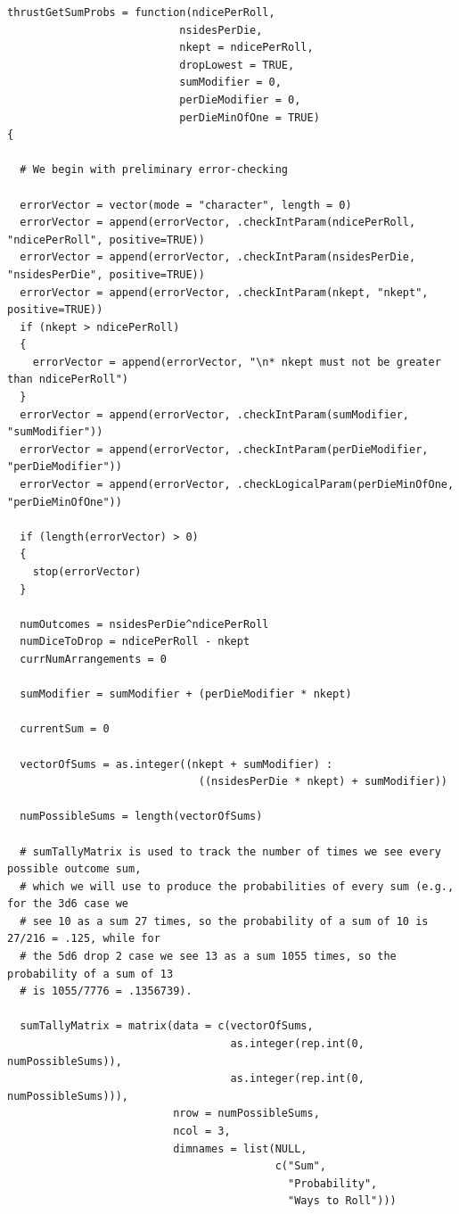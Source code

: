 \documentclass[12pt]{article}
\begin{document}
\begin{lstlisting}
thrustGetSumProbs = function(ndicePerRoll,
                           nsidesPerDie,
                           nkept = ndicePerRoll,
                           dropLowest = TRUE,
                           sumModifier = 0,
                           perDieModifier = 0,
                           perDieMinOfOne = TRUE)
{
  
  # We begin with preliminary error-checking
  
  errorVector = vector(mode = "character", length = 0)
  errorVector = append(errorVector, .checkIntParam(ndicePerRoll, "ndicePerRoll", positive=TRUE))
  errorVector = append(errorVector, .checkIntParam(nsidesPerDie, "nsidesPerDie", positive=TRUE))
  errorVector = append(errorVector, .checkIntParam(nkept, "nkept", positive=TRUE))
  if (nkept > ndicePerRoll)
  {
    errorVector = append(errorVector, "\n* nkept must not be greater than ndicePerRoll")
  }
  errorVector = append(errorVector, .checkIntParam(sumModifier, "sumModifier"))
  errorVector = append(errorVector, .checkIntParam(perDieModifier, "perDieModifier"))
  errorVector = append(errorVector, .checkLogicalParam(perDieMinOfOne, "perDieMinOfOne"))
  
  if (length(errorVector) > 0)
  {
    stop(errorVector)
  }
  
  numOutcomes = nsidesPerDie^ndicePerRoll
  numDiceToDrop = ndicePerRoll - nkept
  currNumArrangements = 0
  
  sumModifier = sumModifier + (perDieModifier * nkept)
  
  currentSum = 0
  
  vectorOfSums = as.integer((nkept + sumModifier) :
                              ((nsidesPerDie * nkept) + sumModifier))
  
  numPossibleSums = length(vectorOfSums)
  
  # sumTallyMatrix is used to track the number of times we see every possible outcome sum,
  # which we will use to produce the probabilities of every sum (e.g., for the 3d6 case we 
  # see 10 as a sum 27 times, so the probability of a sum of 10 is 27/216 = .125, while for
  # the 5d6 drop 2 case we see 13 as a sum 1055 times, so the probability of a sum of 13
  # is 1055/7776 = .1356739).
  
  sumTallyMatrix = matrix(data = c(vectorOfSums,
                                   as.integer(rep.int(0, numPossibleSums)),
                                   as.integer(rep.int(0, numPossibleSums))),
                          nrow = numPossibleSums,
                          ncol = 3,
                          dimnames = list(NULL,
                                          c("Sum",
                                            "Probability",
                                            "Ways to Roll")))
  

\end{lstlisting}
\end{document}
